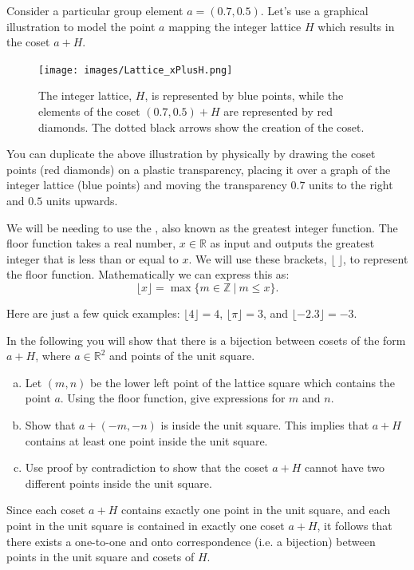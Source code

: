 \begin{example}\label{example:actions:IntLatIntro} Consider a particular group element $a=(0.7,0.5)$. Let's use a graphical illustration to model the point $a$ mapping the integer lattice $H$ which results in the coset $a+H$.

\begin{figure}[htpb]
\begin{center}
\texttt{[image: images/Lattice\_xPlusH.png]}
\caption{\label{fig:Lattice_xPlusH}The integer lattice, $H$, is represented by blue points, while the elements of the coset $(0.7,0.5)+H$ are represented by red diamonds. The dotted black arrows show the creation of the coset.}
\end{center}
\end{figure}

You can duplicate the above illustration by physically by drawing the coset points (red diamonds) on a plastic transparency, placing it over a graph of the integer lattice (blue points) and moving the transparency $0.7$ units to the right and $0.5$ units upwards.
\end{example}

We will be needing to use the , also known as the greatest integer function. The floor function takes a real number, $x \in \mathbb{R}$ as input and outputs the greatest integer that is less than or equal to $x$. We will use these brackets, $\lfloor~\rfloor$, to represent the floor function. Mathematically we can express this as:
$$\lfloor x \rfloor=\max \{ m\in \mathbb{Z} ~|~m\leq x \}.$$

Here are just a few quick examples: $\lfloor 4 \rfloor = 4$, $\lfloor \pi \rfloor = 3$, and $\lfloor -2.3 \rfloor = -3$.

\begin{exercise}\label{exercise:actions:IntLatBijection} In the following you will show that there is a bijection between cosets of the form $a+H$, where $a\in\mathbb{R}^2$ and points of the unit square.
\begin{enumerate}[(a)]
\item Let $(m,n)$ be the lower left point of the lattice square which contains the point $a$. Using the floor function, give  expressions for $m$ and $n$.
\item Show that $a+(-m,-n)$ is inside the unit square. This implies that $a+H$ contains at least one point inside the unit square.
\item Use proof by contradiction to show that the coset $a+H$ cannot have two different points inside the unit square.
\end{enumerate}
Since each coset $a+H$ contains exactly one point in the unit square, and each point in the unit square is contained in exactly one coset $a+H$, it follows that there exists a one-to-one and onto correspondence (i.e. a bijection) between points in the unit square and cosets of $H$.
\end{exercise}

